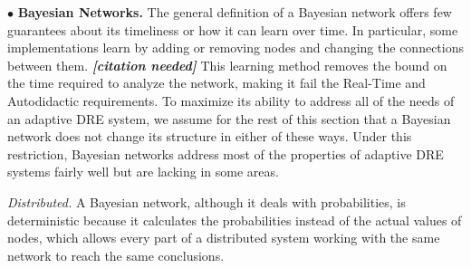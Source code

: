 \documentclass[conference]{IEEEtran}
\begin{document}
%
%

$\bullet$ {\bf Bayesian Networks.}
The general definition of a Bayesian network offers few guarantees about its timeliness or how it can learn over time. In particular, some implementations learn by adding or removing nodes and changing the connections between them. \textbf{\emph{[citation needed]}} This learning method removes the bound on the time required to analyze the network, making it fail the Real-Time and Autodidactic requirements. To maximize its ability to address all of the needs of an adaptive DRE system, we assume for the rest of this section that a Bayesian network does not change its structure in either of these ways. Under this restriction, Bayesian networks address most of the properties of adaptive DRE systems fairly well but are lacking in some areas.

	\emph{Distributed.} A Bayesian network, although it deals with probabilities, is deterministic because it calculates the probabilities instead of the actual values of nodes, which allows every part of a distributed system working with the same network to reach the same conclusions.
	
\end{document}
